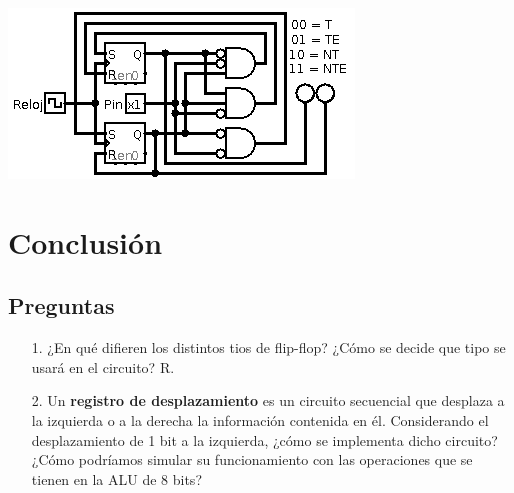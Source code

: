 \documentclass[12pt, letterpaper]{article}
\begin{document}
        \begin{center}
          \includegraphics{automata.png}
        \end{center}


    \section{Conclusión}

      \subsection{Preguntas}

        \begin{itemize}
          \item[1.] ¿En qué difieren los distintos tios de flip-flop? ¿Cómo se
                    decide que tipo se usará en el circuito?
                    R. 
          \item[2.] Un \textbf{registro de desplazamiento} es un circuito
                    secuencial que desplaza a la izquierda o a la derecha la
                    información contenida en él. Considerando el desplazamiento
                    de 1 bit a la izquierda, ¿cómo se implementa dicho circuito?
                    ¿Cómo podríamos simular su funcionamiento con las operaciones
                    que se tienen en la ALU de 8 bits?
        \end{itemize}

  
\end{document}
